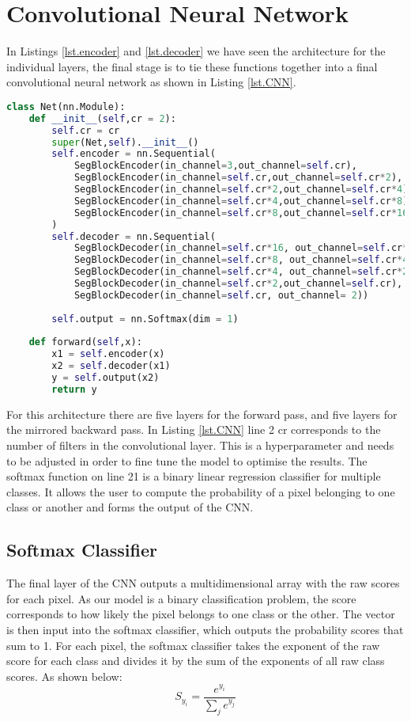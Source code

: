 \section{Convolutional Neural Network}\label{sub.CNN}
In Listings \ref{lst.encoder} and \ref{lst.decoder} we have seen the architecture for the individual layers, the final stage is to tie these functions together into a final convolutional neural network as shown in Listing \ref{lst.CNN}.
\begin{lstlisting}[language=Python, caption = {A Fully connected Convolutional Neural Network. Shows how the encoder and decoder classes are arranged sequentially in order to transform the data and make a prediction on the pixel class.}, label={lst.CNN},float,floatplacement=htbp]
class Net(nn.Module):
    def __init__(self,cr = 2):
        self.cr = cr
        super(Net,self).__init__()
        self.encoder = nn.Sequential(
            SegBlockEncoder(in_channel=3,out_channel=self.cr),
            SegBlockEncoder(in_channel=self.cr,out_channel=self.cr*2),
            SegBlockEncoder(in_channel=self.cr*2,out_channel=self.cr*4),
            SegBlockEncoder(in_channel=self.cr*4,out_channel=self.cr*8),
            SegBlockEncoder(in_channel=self.cr*8,out_channel=self.cr*16)
        )
        self.decoder = nn.Sequential(
            SegBlockDecoder(in_channel=self.cr*16, out_channel=self.cr*8),
            SegBlockDecoder(in_channel=self.cr*8, out_channel=self.cr*4),
            SegBlockDecoder(in_channel=self.cr*4, out_channel=self.cr*2),
            SegBlockDecoder(in_channel=self.cr*2,out_channel=self.cr),
            SegBlockDecoder(in_channel=self.cr, out_channel= 2))
        
        self.output = nn.Softmax(dim = 1)
        
    def forward(self,x):
        x1 = self.encoder(x)
        x2 = self.decoder(x1)
        y = self.output(x2)
        return y
\end{lstlisting}
For this architecture there are five layers for the forward pass, and five layers for the mirrored backward pass. In Listing \ref{lst.CNN} line 2 cr corresponds to the number of filters in the convolutional layer. This is a hyperparameter and needs to be adjusted in order to fine tune the model to optimise the results. The softmax function on line 21 is a binary linear regression classifier for multiple classes. It allows the user to compute the probability of a pixel belonging to one class or another and forms the output of the CNN.
\subsection{Softmax Classifier}\label{sec.softmax}
The final layer of the CNN outputs a multidimensional array with the raw scores for each pixel. As our model is a binary classification problem, the score corresponds to how likely the pixel belongs to one class or the other. The vector is then input into the softmax classifier, which outputs the probability scores that sum to 1. For each pixel, the softmax classifier takes the exponent of the raw score for each class and divides it by the sum of the exponents of all raw class scores. As shown below:
\[S_{y_i} = \frac{e^{y_i}}{\sum_j e^{y_j}}\]



